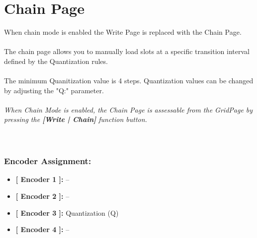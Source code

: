 \chapter{Chain Page}
When chain mode is enabled the Write Page is replaced with the Chain Page.\\
\\
The chain page allows you to manually load slots at a specific transition interval defined by the Quantization rules.\\
\\
The minimum Quanitization value is 4 steps. Quantization values can be changed by adjusting the "Q:" parameter.
\\\\
\textit{When Chain Mode is enabled, the Chain Page is assessable from the GridPage by pressing the  \textbf{[Write | Chain]} function button.}
\\\\
\\
\subsection{Encoder Assignment:}

\begin{itemize}
	\item \textbf{[ Encoder 1 ]: } --
	\item \textbf{[ Encoder 2 ]: } --
	\item \textbf{[ Encoder 3 ]: } Quantization (Q)
	\item \textbf{[ Encoder 4 ]: }--
\end{itemize}
